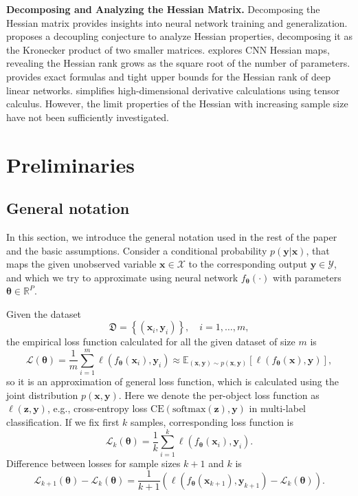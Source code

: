 \documentclass{article}
\begin{document}
\textbf{Decomposing and Analyzing the Hessian Matrix.}
Decomposing the Hessian matrix provides insights into neural network training and generalization. \cite{wu2022dissectinghessianunderstandingcommon} proposes a decoupling conjecture to analyze Hessian properties, decomposing it as the Kronecker product of two smaller matrices. \cite{singh2023hessianperspectivenatureconvolutional} explores CNN Hessian maps, revealing the Hessian rank grows as the square root of the number of parameters. \cite{singh2021analyticinsightsstructurerank} provides exact formulas and tight upper bounds for the Hessian rank of deep linear networks. \cite{skorski2019chainruleshessianhigher} simplifies high-dimensional derivative calculations using tensor calculus. However, the limit properties of the Hessian with increasing sample size have not been sufficiently investigated. 

\section{Preliminaries}\label{sec:prelim}

\subsection{General notation}

In this section, we introduce the general notation used in the rest of the paper and the basic assumptions. Consider a conditional probability $p(\mathbf{y}|\mathbf{x})$, that maps the given unobserved variable $\mathbf{x} \in \mathcal{X}$ to the corresponding output $\mathbf{y} \in \mathcal{Y}$, and which we try to approximate using neural network $f_{\boldsymbol{\theta}}(\cdot)$ with parameters $\boldsymbol{\theta} \in \mathbb{R}^{P}$.

Given the dataset
\[ \mathfrak{D} = \left\{ (\mathbf{x}_i, \mathbf{y}_i) \right\}, \quad i = 1, \ldots, m, \]
the empirical loss function calculated for all the given dataset of size $m$ is
\[ \mathcal{L}(\boldsymbol{\theta}) = \dfrac{1}{m} \sum\limits_{i=1}^{m} \ell(f_{\boldsymbol{\theta}}(\mathbf{x}_i), \mathbf{y}_i) \approx \mathbb{E}_{(\mathbf{x}, \mathbf{y}) \sim p(\mathbf{x}, \mathbf{y})} \left[ \ell(f_{\boldsymbol{\theta}}(\mathbf{x}), \mathbf{y}) \right], \]
so it is an approximation of general loss function, which is calculated using the joint distribution $p(\mathbf{x}, \mathbf{y})$. Here we denote the per-object loss function as $\ell(\mathbf{z}, \mathbf{y})$, e.g., cross-entropy loss $\mathrm{CE}(\mathrm{softmax}(\mathbf{z}), \mathbf{y})$ in multi-label classification. If we fix first $k$ samples, corresponding loss function is
\[ \mathcal{L}_k(\boldsymbol{\theta}) = \dfrac{1}{k} \sum\limits_{i=1}^{k} \ell(f_{\boldsymbol{\theta}}(\mathbf{x}_i), \mathbf{y}_i). \]
Difference between losses for sample sizes $k+1$ and $k$ is
\begin{equation}\label{eq:difference}
    \mathcal{L}_{k+1}(\boldsymbol{\theta}) - \mathcal{L}_k(\boldsymbol{\theta}) = \dfrac{1}{k+1} \left( \ell(f_{\boldsymbol{\theta}}(\mathbf{x}_{k+1}), \mathbf{y}_{k+1}) - \mathcal{L}_{k}(\boldsymbol{\theta}) \right).
\end{equation}
\end{document}
